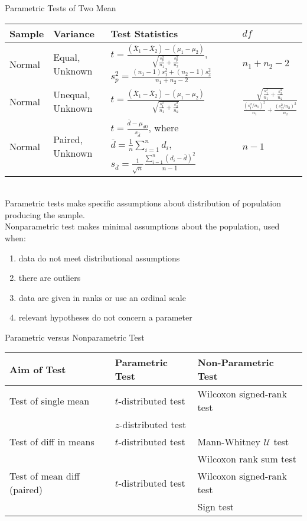 \begin{flushleft}
Parametric Tests of Two Mean
\begin{tabularx}{\textwidth}{p{4em}|p{8.5em}|p{22em}|X}
\hline
\rowcolor{gray!30}
Sample & Variance & Test Statistics & $df$ \\
\hline
Normal & Equal, Unknown & $t = \frac{(\overline{X}_1 - \overline{X}_2) - (\mu_1 - \mu_2)}{\sqrt{\frac{s_p^2}{n_1} + \frac{s_p^2}{n_2}}}$, $s_p^2 = \frac{(n_1 - 1)s_1^2 + (n_2 - 1)s_2^2}{n_1 + n_2 - 2}$ & $n_1 + n_2 -2$ \\
\hline
Normal & Unequal, Unknown & $t = \frac{(\overline{X}_1 - \overline{X}_2) - (\mu_1 - \mu_2)}{\sqrt{\frac{s_1^2}{n_1} + \frac{s_2^2}{n_2}}}$ & $\frac{\sqrt{\frac{s_1^2}{n_1} + \frac{s_2^2}{n_2}}}{\frac{(s_1^2 / n_1)^2}{n_1} + \frac{(s_2^2 / n_2)^2}{n_2}}$ \\
\hline
Normal & Paired, Unknown & $t = \frac{\overline{d} - \mu_{d0}}{s_{\overline{d}}}$, where $\overline{d} = \frac{1}{n} \sum\limits_{i=1}^n d_i$, $s_{\overline{d}} = \frac{1}{\sqrt{n}} \frac{\sum\limits_{i=1}^n (d_i - \overline{d})^2}{n-1}$ & $n-1$ \\
\hline
\end{tabularx}
\end{flushleft}

\begin{remark} \\
Parametric tests make specific assumptions about distribution of population producing the sample.\\
Nonparametric test makes minimal assumptions about the population, used when:
\begin{enumerate}[label=\roman*.]
\setlength{\itemsep}{0pt}
\item data do not meet distributional assumptions
\item there are outliers
\item data are given in ranks or use an ordinal scale
\item relevant hypotheses do not concern a parameter
\end{enumerate}
\end{remark}

\begin{flushleft}
Parametric versus Nonparametric Test
\begin{tabularx}{\textwidth}{p{12em}|X|X}
\hline
\rowcolor{gray!30}
Aim of Test & Parametric Test & Non-Parametric Test \\
\hline
Test of single mean & $t$-distributed test & Wilcoxon signed-rank test\\
& $z$-distributed test & \\
\hline
Test of diff in means & $t$-distributed test & Mann-Whitney $\mathcal{U}$ test \\
& & Wilcoxon rank sum test \\
\hline
Test of mean diff (paired) & $t$-distributed test & Wilcoxon signed-rank test \\
& & Sign test \\
\hline
\end{tabularx}
\end{flushleft}

